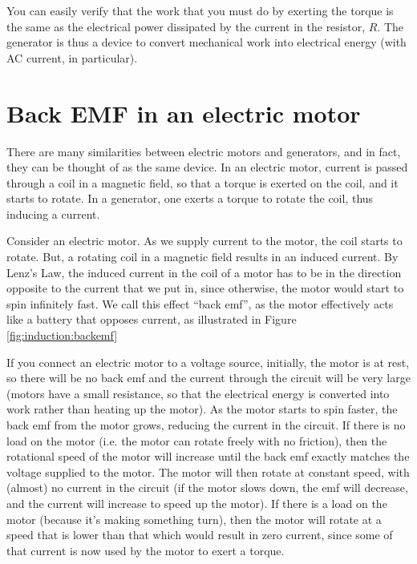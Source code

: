 You can easily verify that the work that you must do by exerting the torque is the same as the electrical power dissipated by the current in the resistor, $R$. The generator is thus a device to convert mechanical work into electrical energy (with AC current, in particular). 

\section{Back EMF in an electric motor}
There are many similarities between electric motors and generators, and in fact, they can be thought of as the same device. In an electric motor, current is passed through a coil in a magnetic field, so that a torque is exerted on the coil, and it starts to rotate. In a generator, one exerts a torque to rotate the coil, thus inducing a current. 

Consider an electric motor. As we supply current to the motor, the coil starts to rotate. But, a rotating coil in a magnetic field results in an induced current. By Lenz's Law, the induced current in the coil of a motor has to be in the direction opposite to the current that we put in, since otherwise, the motor would start to spin infinitely fast. We call this effect ``back emf'', as the motor effectively acts like a battery that opposes current, as illustrated in Figure \ref{fig:induction:backemf}


If you connect an electric motor to a voltage source, initially, the motor is at rest, so there will be no back emf and the current through the circuit will be very large (motors have a small resistance, so that the electrical energy is converted into work rather than heating up the motor). As the motor starts to spin faster, the back emf from the motor grows, reducing the current in the circuit. If there is no load on the motor (i.e. the motor can rotate freely with no friction), then the rotational speed of the motor will increase until the back emf exactly matches the voltage supplied to the motor. The motor will then rotate at constant speed, with (almost) no current in the circuit (if the motor slows down, the emf will decrease, and the current will increase to speed up the motor). If there is a load on the motor (because it's making something turn), then the motor will rotate at a speed that is lower than that which would result in zero current, since some of that current is now used by the motor to exert a torque.

